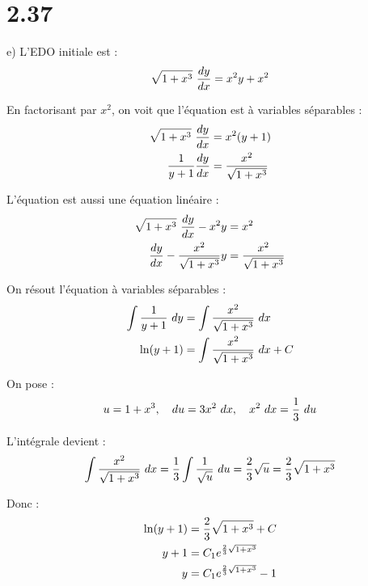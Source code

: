 \section*{2.37}

e) L'EDO initiale est :
\begin{align*}
    \sqrt{1 + x^3}\ \dfrac{d y}{d x} = x^2 y + x^2
\end{align*}

En factorisant par $x^2$, on voit que l'équation est à variables séparables :
\begin{align*}
    \sqrt{1 + x^3}\ \dfrac{d y}{d x} &= x^2(y + 1) \\
    \dfrac{1}{y+1}\dfrac{d y}{d x} &= \dfrac{x^2}{\sqrt{1 + x^3}}
\end{align*}

L'équation est aussi une équation linéaire :
\begin{align*}
    \sqrt{1 + x^3}\ \dfrac{d y}{d x} -x^2 y &= x^2 \\
    \dfrac{d y}{d x} -\dfrac{x^2}{\sqrt{1 + x^3}}y &= \dfrac{x^2}{\sqrt{1 + x^3}}
\end{align*}

On résout l'équation à variables séparables :
\begin{align*}
    \int{\dfrac{1}{y+1}\ dy} &= \int{\dfrac{x^2}{\sqrt{1 + x^3}}\ dx} \\
    \ln(y+1) &= \int{\dfrac{x^2}{\sqrt{1 + x^3}}\ dx} +C \\
\end{align*}

On pose :
\begin{align*}
    u = 1+x^3,\quad du = 3x^2\ dx,\quad x^2\ dx = \dfrac{1}{3}\ du
\end{align*}

L'intégrale devient :
\begin{align*}
    \int{\dfrac{x^2}{\sqrt{1 + x^3}}\ dx} &= \dfrac{1}{3}\int{\dfrac{1}{\sqrt{u}}\ du} =
    \dfrac{2}{3}\sqrt{u} = \dfrac{2}{3}\sqrt{1+x^3}\\
\end{align*}

Donc :
\begin{align*}
    \ln(y+1) &= \dfrac{2}{3}\sqrt{1+x^3} +C \\
    y+1 &= C_1 e^{\frac{2}{3}\sqrt{1+x^3}} \\
    y &= C_1 e^{\frac{2}{3}\sqrt{1+x^3}} - 1
\end{align*}
